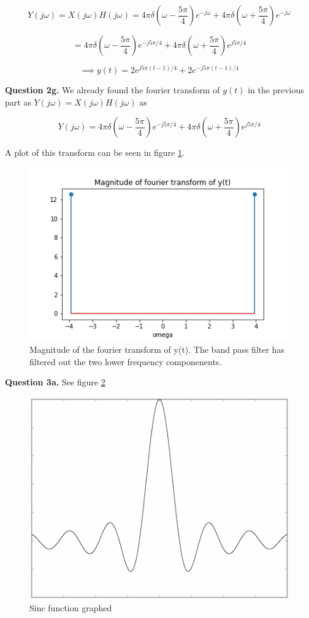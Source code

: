\documentclass[letterpaper, reqno,11pt]{article}
\begin{document}
\[
    Y(j\omega)=X(j\omega)H(j\omega)=4\pi\delta(\omega-\frac{5\pi}4)e^{-j\omega}+4\pi\delta(\omega+\frac{5\pi}4)e^{-j\omega}
\]

\[
    =4\pi\delta(\omega-\frac{5\pi}4)e^{-j5\pi/4}+4\pi\delta(\omega+\frac{5\pi}4)e^{j5\pi/4}    
\]

\[
    \implies y(t)=2e^{j5\pi (t-1)/4}+2e^{-j5\pi (t-1)/4}
\]

{\noindent\bf Question 2g.} We already found the fourier transform of $y(t)$ in the previous part as $Y(j\omega)=X(j\omega)H(j\omega)$ as 

\[
    Y(j\omega)=4\pi\delta(\omega-\frac{5\pi}4)e^{-j5\pi/4}+4\pi\delta(\omega+\frac{5\pi}4)e^{j5\pi/4}    
\]

A plot of this transform can be seen in figure \ref{fig:q2g}. 

\begin{figure}[htbp]
\centering
\includegraphics[width=\textwidth]{q2g.png}
\caption{Magnitude of the fourier transform of y(t). The band pass filter has filtered out the two lower frequency componenents. }
\label{fig:q2g}
\end{figure}


{\noindent\bf Question 3a.} See figure \ref{fig:q3a}

\begin{figure}[htbp]
\centering
\includegraphics[width=\textwidth]{q3a}
\caption{Sinc function graphed}
\label{fig:q3a}
\end{figure}
\end{document}
